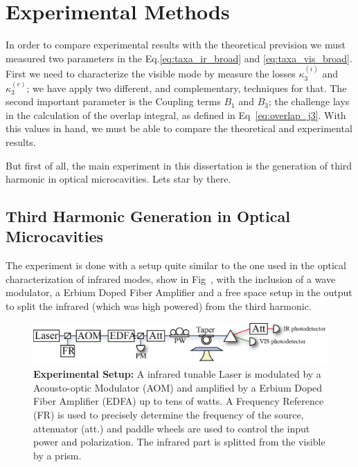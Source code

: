 \chapter{Experimental Methods}
In order to compare experimental results with the theoretical prevision we must measured two parameters in the Eq.\ref{eq:taxa_ir_broad} and \ref{eq:taxa_vis_broad}. First we need to characterize the visible mode by measure the losses $\kappa^(i)_3$ and $\kappa^(e)_3$; we have apply two different, and complementary, techniques for that. The second important parameter is the Coupling terms $B_1$ and $B_3$; the challenge lays in the calculation of the overlap integral, as defined in Eq~\ref{eq:overlap_j3}. With this values in hand, we must be able to compare the theoretical and experimental results. 

But first of all, the main experiment in this dissertation is the generation of third harmonic in optical microcavities. Lets star by there. %

\section{Third Harmonic Generation in Optical Microcavities}

The experiment is done with a setup quite similar to the one used in the optical characterization of infrared modes, show in Fig~, with the inclusion of a wave modulator, a Erbium Doped Fiber Amplifier and a free space setup in the output to split the infrared (which was high powered) from the third harmonic.
\begin{figure}[h!]
    \centering
    \includegraphics[width = 16 cm]{figuras/Dissertation_thg_setup.jpg}
    \caption{\textbf{Experimental Setup:} A infrared tunable Laser is modulated by a Acousto-optic Modulator (AOM) and amplified by a Erbium Doped Fiber Amplifier (EDFA) up to tens of watts. A Frequency Reference (FR) is used to precisely determine the frequency of the source, attenuator (att.) and paddle wheels are used to control the input power and polarization. The infrared part is splitted from the visible by a prism.}
    \label{fig:thg_setup}
\end{figure}

